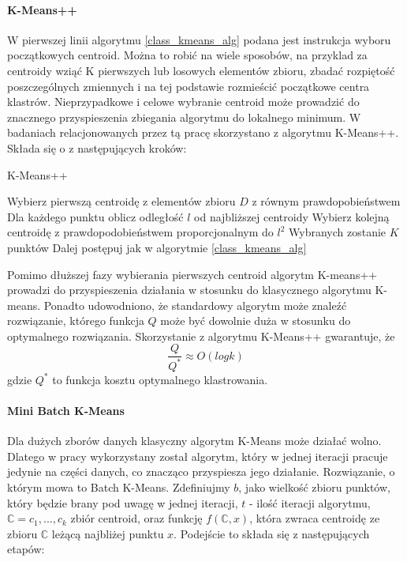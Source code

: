 \documentclass{article}
\begin{document}
\paragraph{K-Means++}
W pierwszej linii algorytmu \ref{class_kmeans_alg} podana jest instrukcja wyboru początkowych centroid. 
Można to robić na wiele sposobów, na przyklad za centroidy wziąć K pierwszych lub losowych elementów zbioru, zbadać rozpiętość poszczególnych zmiennych i na tej podstawie rozmieścić początkowe centra klastrów.
Nieprzypadkowe i celowe wybranie centroid może prowadzić do znacznego przyspieszenia zbiegania algorytmu do lokalnego minimum.
W badaniach relacjonowanych przez tą pracę skorzystano z algorytmu K-Means++\cite{C.K.Reddy2014}.
Składa się o z następujących kroków:
\begin{algorithm}
\label{k_means++}
\caption{K-Means++}
\begin{algorithmic}[1]
\STATE Wybierz pierwszą centroidę z elementów zbioru \(D\) z równym prawdopobieństwem
\REPEAT
\STATE Dla każdego punktu oblicz odległość \(l\) od najbliższej centroidy
\STATE Wybierz kolejną centroidę z prawdopodobieństwem proporcjonalnym do \(l^2\)
\UNTIL Wybranych zostanie \(K\) punktów
\STATE Dalej postępuj jak w algorytmie \ref{class_kmeans_alg}
\end{algorithmic}
\end{algorithm}

Pomimo dłuższej fazy wybierania pierwszych centroid algorytm K-means++ prowadzi do przyspieszenia działania w stosunku do klasycznego algorytmu K-means. Ponadto udowodniono, że standardowy algorytm może znaleźć rozwiązanie, którego funkcja \(Q\) może być dowolnie duża w stosunku do optymalnego rozwiązania.
Skorzystanie z algorytmu K-Means++ gwarantuje, że 
\[\frac{Q}{Q^*} \approx O(log k)\]
gdzie \(Q^*\) to funkcja kosztu optymalnego klastrowania. %

\paragraph{Mini Batch K-Means}
Dla dużych zborów danych klasyczny algorytm K-Means może działać wolno. Dlatego w pracy wykorzystany został algorytm, który w jednej iteracji pracuje jedynie na części danych, co znacząco przyspiesza jego działanie\citep{Sculley2010}.
Rozwiązanie, o którym mowa to Batch K-Means.
Zdefiniujmy \(b\), jako wielkość zbioru punktów, który będzie brany pod uwagę w jednej iteracji, \(t\) - ilość iteracji algorytmu, \(\mathbb{C} = {c_1, ..., c_k}\) zbiór centroid, oraz funkcję \(f(\mathbb{C}, x)\), która zwraca centroidę ze zbioru \(\mathbb{C}\) leżącą najbliżej punktu \(x\).
Podejście to składa się z następujących etapów:
\end{document}
